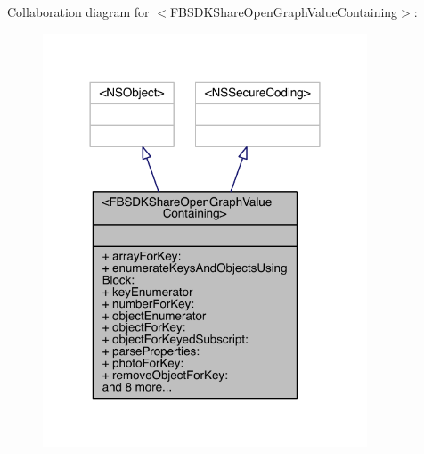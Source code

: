 Collaboration diagram for $<$F\-B\-S\-D\-K\-Share\-Open\-Graph\-Value\-Containing$>$\-:
\nopagebreak
\begin{figure}[H]
\begin{center}
\leavevmode
\includegraphics[width=273pt]{protocol_f_b_s_d_k_share_open_graph_value_containing-p__coll__graph}
\end{center}
\end{figure}

